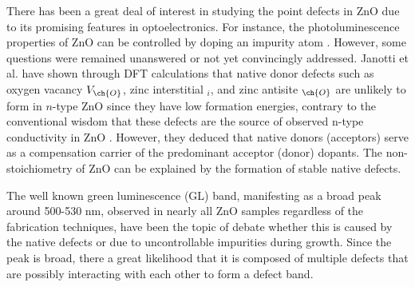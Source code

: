 There has been a great deal of interest in studying the point defects in ZnO due to its promising features in optoelectronics. For instance, the photoluminescence properties of ZnO can be controlled by doping an impurity atom \citep{Musavi2019}.  However, some questions were remained unanswered or not yet convincingly addressed. Janotti et al. \citep{Janotti2007} have shown through DFT calculations that native donor defects such as oxygen vacancy $V_{\ch{O}}$, zinc interstitial $_i$, and zinc antisite $_{\ch{O}}$  are unlikely to form in $n$-type ZnO since they have low formation energies, contrary to the conventional wisdom that these defects are the source of  observed n-type conductivity in ZnO \citep{Harrison1954,Thomas1957,Hausmann1973,Hagemark1976}. However, they deduced that native donors (acceptors) serve as a compensation carrier of the predominant acceptor (donor) dopants.  The non-stoichiometry of ZnO can be explained by the formation of stable native defects.


The well known green luminescence (GL) band, manifesting as a broad peak around 500-530 nm,  observed in nearly all ZnO samples regardless of the fabrication techniques, have been the topic of debate whether this is caused by the native defects or due to uncontrollable impurities during growth. Since the peak is  broad, there a great likelihood that it is composed of multiple defects that are possibly interacting with each other to form a defect band.







